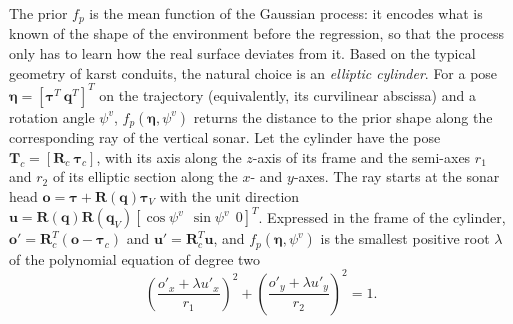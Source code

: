 The prior $f_p$ is the mean function of the Gaussian process: it encodes what is known of the shape
of the environment before the regression, so that the process only has to learn how the real
surface deviates from it. Based on the typical geometry of karst conduits, the natural choice is an
\emph{elliptic cylinder}. For a pose $\boldsymbol{\eta} = [\boldsymbol{\tau}^T\ \mathbf{q}^T]^T$ on
the trajectory (equivalently, its curvilinear abscissa) and a rotation angle $\psi^v$,
$f_p(\boldsymbol{\eta}, \psi^v)$ returns the distance to the prior shape along the corresponding ray
of the vertical sonar. Let the cylinder have the pose $\mathbf{T}_c = [\mathbf{R}_c\ \boldsymbol{\tau}_c]$,
with its axis along the $z$-axis of its frame and the semi-axes $r_1$ and $r_2$ of its elliptic
section along the $x$- and $y$-axes. The ray starts at the sonar head
$\mathbf{o} = \boldsymbol{\tau} + \mathbf{R}(\mathbf{q})\boldsymbol{\tau}_V$ with the unit direction
$\mathbf{u} = \mathbf{R}(\mathbf{q})\mathbf{R}(\mathbf{q}_V)[\cos\psi^v\ \ \sin\psi^v\ \ 0]^T$.
Expressed in the frame of the cylinder, $\mathbf{o}' = \mathbf{R}_c^T(\mathbf{o} - \boldsymbol{\tau}_c)$
and $\mathbf{u}' = \mathbf{R}_c^T\mathbf{u}$, and $f_p(\boldsymbol{\eta}, \psi^v)$ is the smallest
positive root $\lambda$ of the polynomial equation of degree two
\begin{equation}                         %
  \left(\frac{o'_x + \lambda u'_x}{r_1}\right)^2 + \left(\frac{o'_y + \lambda u'_y}{r_2}\right)^2 = 1.
  \label{eq:msis_prior}
\end{equation}

